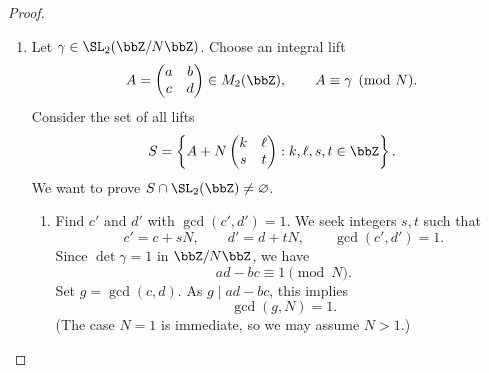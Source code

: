 \begin{proof}
    \leavevmode
    \begin{enumerate}[label=(\arabic*)]
        \item Let $\gamma \in \SL_2(\bbZ/N\bbZ)$. Choose an integral lift
        \[
            A = \begin{pmatrix}a & b\\ c & d\end{pmatrix} \in M_2(\bbZ),
            \qquad A \equiv \gamma\pmod N.
        \]
        Consider the set of all lifts
        \[
            S = \left\{A + N\begin{pmatrix}k & \ell\\ s & t\end{pmatrix} :
            k, \ell, s, t \in \bbZ\right\}.
        \]
        We want to prove $S \cap \SL_2(\bbZ) \ne \varnothing$.

        \begin{enumerate}[label=\textit{Step~\arabic*.}]
            \item Find $c'$ and $d'$ with $\gcd(c', d') = 1$.
            We seek integers $s, t$ such that
            \[
                c' = c + sN, \qquad d' = d + tN, \qquad \gcd(c', d') = 1.
            \]
            Since $\det\gamma = 1$ in $\bbZ/N\bbZ$, we have
            \[
                ad - bc \equiv 1\pmod N.
            \]
            Set $g = \gcd(c, d)$. As $g \mid ad - bc$, this implies
            \[
                \boxed{\gcd(g, N) = 1.}
            \]
            (The case $N = 1$ is immediate, so we may assume $N > 1$.)


\end{enumerate}
\end{enumerate}
\end{proof}
